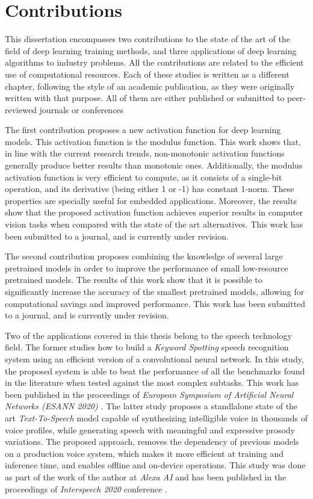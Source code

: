 \section{Contributions}
This dissertation encompasses two contributions to the state of the art of the field of deep learning training methods, and three applications of deep learning algorithms to industry problems. All the contributions are related to the efficient use of computational resources. Each of these studies is written as a different chapter, following the style of an academic publication, as they were originally written with that purpose. All of them are either published or submitted to peer-reviewed journals or conferences

The first contribution proposes a new activation function for deep learning models. This activation function is the modulus function. This work shows that, in line with the current research trends, non-monotonic activation functions generally produce better results than monotonic ones. Additionally, the modulus activation function is very efficient to compute, as it consists of a single-bit operation, and its derivative (being either 1 or -1) has constant 1-norm. These properties are specially useful for embedded applications. Moreover, the results show that the proposed activation function achieves superior results in computer vision tasks when compared with the state of the art alternatives. This work has been submitted to a journal, and is currently under revision.

The second contribution proposes combining the knowledge of several large pretrained models in order to improve the performance of small low-resource pretrained models. The results of this work show that it is possible to significantly increase the accuracy of the smallest pretrained models, allowing for computational savings and improved performance. This work has been submitted to a journal, and is currently under revision.

Two of the applications covered in this thesis belong to the speech technology field. The former studies how to build a \textit{Keyword Spotting} speech recognition system using an efficient version of a convolutional neural network. In this study, the proposed system is able to beat the performance of all the benchmarks found in the literature when tested against the most complex subtasks. This work has been published in the proceedings of \textit{European Symposium of Artificial Neural Networks (ESANN 2020)} \cite{valles2021a}. The latter study proposes a standlalone state of the art \textit{Text-To-Speech} model capable of synthesizing intelligible voice in thousands of voice profiles, while generating speech with meaningful and expressive prosody variations. The proposed approach, removes the dependency of previous models on a production voice system, which makes it more efficient at training and inference time, and enables offline and on-device operations. This study was done as part of the work of the author at \textit{Alexa AI} and has been published in the proceedings of \textit{Interspeech 2020} conference \cite{valles2021b}.

